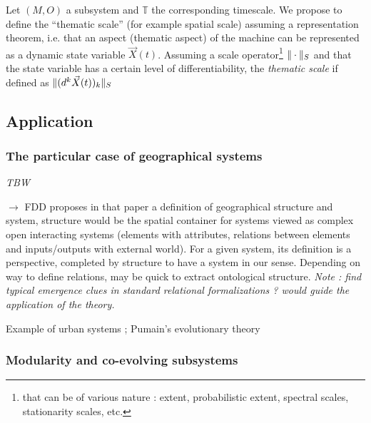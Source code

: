 Let $(M,O)$ a subsystem and $\mathbb{T}$ the corresponding timescale. We propose to define the ``thematic scale'' (for example spatial scale) assuming a representation theorem, i.e. that an aspect (thematic aspect) of the machine can be represented as a dynamic state variable $\vec{X}(t)$. Assuming a scale operator\footnote{that can be of various nature : extent, probabilistic extent, spectral scales, stationarity scales, etc.} $\| \cdot \|_{S}$ and that the state variable has a certain level of differentiability, the \emph{thematic scale} if defined as $\| (d^k \vec{X}(t))_k \|_S$


\subsection*{Application}

\subsubsection*{The particular case of geographical systems}







\textit{TBW}

\cite{dollfus1975some} %
$\rightarrow$ FDD proposes in that paper a definition of geographical structure and system, structure would be the spatial container for systems viewed as complex open interacting systems (elements with attributes, relations between elements and inputs/outputs with external world). For a given system, its definition is a perspective, completed by structure to have a system in our sense. Depending on way to define relations, may be quick to extract ontological structure. \textit{Note : find typical emergence clues in standard relational formalizations ? would guide the application of the theory.}

Example of urban systems ; Pumain's evolutionary theory~\cite{pumain2010theorie}


\subsubsection*{Modularity and co-evolving subsystems}

